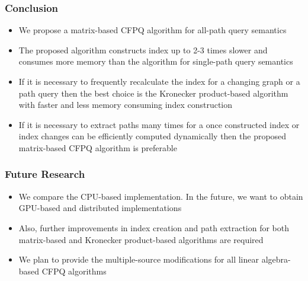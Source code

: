 \documentclass[xcolor=table]{beamer}
\begin{document}
\begin{frame}[fragile] \frametitle{Conclusion}
  \begin{itemize}
    \item We propose a matrix-based CFPQ algorithm for all-path query semantics
    \pause
    \item The proposed algorithm constructs index up to 2-3 times slower and consumes more memory than the algorithm for single-path query semantics
    \pause
    \item If it is necessary to frequently recalculate
    the index for a changing graph or a path query then the best
    choice is the Kronecker product-based algorithm with
    faster and less memory consuming index construction
    \pause
    \item If it is     necessary to extract paths many times for a once constructed
    index or index changes can be efficiently computed dynamically then the proposed matrix-based CFPQ algorithm is  preferable
  \end{itemize}
    
    
\end{frame}

\begin{frame}[fragile] \frametitle{Future Research}
  \begin{itemize}
  	\item We compare the CPU-based implementation. In the future, we
  	want to obtain GPU-based and distributed implementations 
  	\item Also, further improvements in index creation and path extraction
  	for both matrix-based and Kronecker product-based algorithms are
  	required
    \item We plan to provide the multiple-source
    modifications for all linear algebra-based CFPQ algorithms
\end{itemize}
\end{frame}
\end{document}
